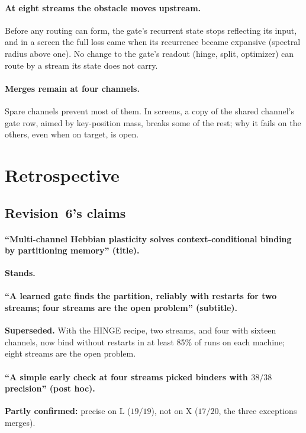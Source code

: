 \documentclass[11pt]{article}
\begin{document}
\paragraph{At eight streams the obstacle moves upstream.} Before any routing can form, the gate's recurrent state stops reflecting its input, and in a screen the full loss came when its recurrence became expansive (spectral radius above one). No change to the gate's readout (hinge, split, optimizer) can route by a stream its state does not carry.

\paragraph{Merges remain at four channels.} Spare channels prevent most of them. In screens, a copy of the shared channel's gate row, aimed by key-position mass, breaks some of the rest; why it fails on the others, even when on target, is open.

\section{Retrospective}
\label{sec:retro}

\subsection{Revision~6's claims}

\paragraph{``Multi-channel Hebbian plasticity solves context-conditional binding by partitioning memory'' (title).} \textbf{Stands.}

\paragraph{``A learned gate finds the partition, reliably with restarts for two streams; four streams are the open problem'' (subtitle).} \textbf{Superseded.} With the HINGE recipe, two streams, and four with sixteen channels, now bind without restarts in at least 85\% of runs on each machine; eight streams are the open problem.

\paragraph{``A simple early check at four streams picked binders with $38/38$ precision'' (post hoc).} \textbf{Partly confirmed:} precise on L ($19/19$), not on X ($17/20$, the three exceptions merges).
\end{document}
